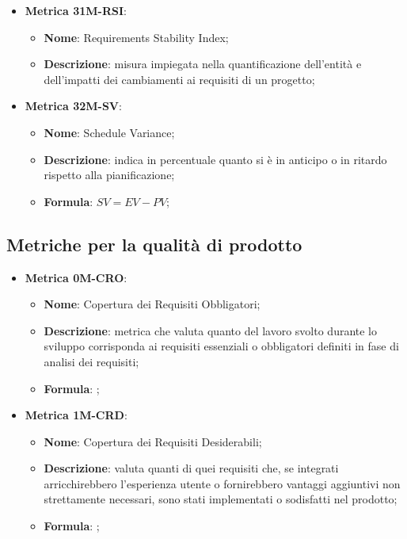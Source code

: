 \begin{itemize}
    \item \textbf{Metrica 31M-RSI}:
    \begin{itemize}
        \item \textbf{Nome}: Requirements Stability Index;
        \item \textbf{Descrizione}: misura impiegata nella quantificazione dell'entità e dell'impatti dei cambiamenti ai requisiti di un progetto;
    \end{itemize}
\end{itemize}

\begin{itemize}
    \item \textbf{Metrica 32M-SV}:
    \begin{itemize}
        \item \textbf{Nome}: Schedule Variance;
        \item \textbf{Descrizione}: indica in percentuale quanto si è in anticipo o in ritardo rispetto alla pianificazione;
        \item \textbf{Formula}: $SV = EV - PV$;
    \end{itemize}
\end{itemize}

\subsection{Metriche per la qualità di prodotto}
\begin{itemize}
    \item \textbf{Metrica 0M-CRO}:
    \begin{itemize}
        \item \textbf{Nome}: Copertura dei Requisiti Obbligatori;
        \item \textbf{Descrizione}: metrica che valuta quanto del lavoro svolto durante lo sviluppo corrisponda ai requisiti essenziali o obbligatori definiti in fase di analisi dei requisiti;
        \item \textbf{Formula}: ;
    \end{itemize}
\end{itemize}

\begin{itemize}
    \item \textbf{Metrica 1M-CRD}:
    \begin{itemize}
        \item \textbf{Nome}: Copertura dei Requisiti Desiderabili;
        \item \textbf{Descrizione}: valuta quanti di quei requisiti che, se integrati arricchirebbero l'esperienza utente o fornirebbero vantaggi aggiuntivi non strettamente necessari, sono stati implementati o sodisfatti nel prodotto;
        \item \textbf{Formula}: ;
    \end{itemize}
\end{itemize}


